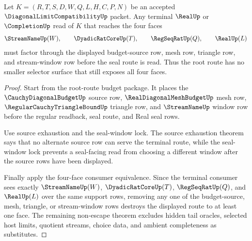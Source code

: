 \begin{theorem}
\label{thm:diagonal-limit-compatibility-root-route-selector-minimality}
Let $K=(R,T,S,D,W,Q,L,H,C,P,N)$ be an accepted $\DiagonalLimitCompatibilityUp$ packet. Any terminal $\RealUp$ or $\CompletionUp$ read of $K$ that reaches the four faces
$$
\StreamNameUp(W),\qquad
\DyadicRatCoreUp(T),\qquad
\RegSeqRatUp(Q),\qquad
\RealUp(L)
$$
must factor through the displayed budget-source row, mesh row, triangle row, and stream-window row before the seal route is read. Thus the root route has no smaller selector surface that still exposes all four faces.
\end{theorem}
\begin{proof}
Start from the root-route budget package. It places the $\CauchyDiagonalBudgetUp$ source row, $\RealDiagonalMeshBudgetUp$ mesh row, $\RegularCauchyTriangleBoundUp$ triangle row, and $\StreamNameUp$ window row before the regular readback, seal route, and Real seal rows.

Use source exhaustion and the seal-window lock. The source exhaustion theorem says that no alternate source row can serve the terminal route, while the seal-window lock prevents a seal-facing read from choosing a different window after the source rows have been displayed.

Finally apply the four-face consumer equivalence. Since the terminal consumer sees exactly $\StreamNameUp(W)$, $\DyadicRatCoreUp(T)$, $\RegSeqRatUp(Q)$, and $\RealUp(L)$ over the same support rows, removing any one of the budget-source, mesh, triangle, or stream-window rows destroys the displayed route to at least one face. The remaining non-escape theorem excludes hidden tail oracles, selected host limits, quotient streams, choice data, and ambient completeness as substitutes.
\end{proof}

